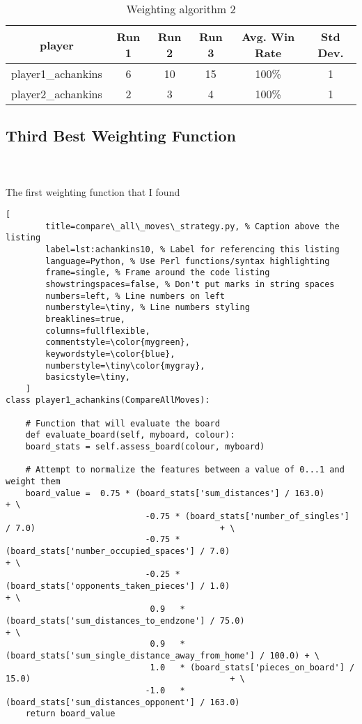 \documentclass[
	12pt, %
]{fphw}
\begin{document}
\begin{table}[ht]
	\centering
	\begin{tabular}{||c | c c c c c||}
		\hline
		player & Run 1&   Run 2 & Run 3 & Avg. Win Rate & Std Dev. \\ [0.5ex]
		\hline\hline
		player1\_achankins &  6 & 10 & 15 & 100\% & 1 \\
		\hline
		player2\_achankins & 2 & 3 & 4 & 100\% & 1 \\ [1ex]
		\hline
	\end{tabular}
	\caption{Weighting algorithm 2}
	\label{table:2}
\end{table}

\subsection*{Third Best Weighting Function}

\hfill\\ \\  The first weighting function that I found

\begin{lstlisting}[
		title=compare\_all\_moves\_strategy.py, % Caption above the listing
		label=lst:achankins10, % Label for referencing this listing
		language=Python, % Use Perl functions/syntax highlighting
		frame=single, % Frame around the code listing
		showstringspaces=false, % Don't put marks in string spaces
		numbers=left, % Line numbers on left
		numberstyle=\tiny, % Line numbers styling
		breaklines=true,
		columns=fullflexible,
		commentstyle=\color{mygreen},
		keywordstyle=\color{blue},
		numberstyle=\tiny\color{mygray},
		basicstyle=\tiny,
	]
class player1_achankins(CompareAllMoves):

    # Function that will evaluate the board
    def evaluate_board(self, myboard, colour):
    board_stats = self.assess_board(colour, myboard)

    # Attempt to normalize the features between a value of 0...1 and weight them
    board_value =  0.75 * (board_stats['sum_distances'] / 163.0)                                        + \
                            -0.75 * (board_stats['number_of_singles'] / 7.0)                                     + \
                            -0.75 * (board_stats['number_occupied_spaces'] / 7.0)                          + \
                            -0.25 * (board_stats['opponents_taken_pieces'] / 1.0)                            + \
                             0.9   * (board_stats['sum_distances_to_endzone'] / 75.0)                      + \
                             0.9   * (board_stats['sum_single_distance_away_from_home'] / 100.0) + \
                             1.0   * (board_stats['pieces_on_board'] / 15.0)                                        + \
                            -1.0   * (board_stats['sum_distances_opponent'] / 163.0)
    return board_value

\end{lstlisting}
\end{document}
